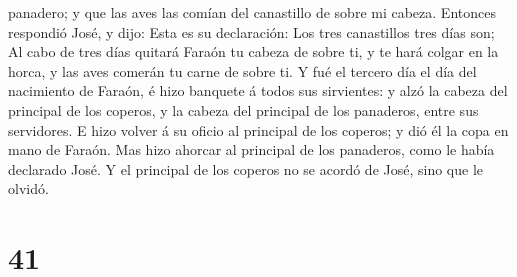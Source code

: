 panadero; y que las aves las comían del canastillo de sobre mi cabeza.
 Entonces respondió José, y dijo: Esta es su declaración:
Los tres canastillos tres días son;  Al cabo de tres días
quitará Faraón tu cabeza de sobre ti, y te hará colgar en la horca, y
las aves comerán tu carne de sobre ti.  Y fué el tercero
día el día del nacimiento de Faraón, é hizo banquete á todos sus
sirvientes: y alzó la cabeza del principal de los coperos, y la cabeza
del principal de los panaderos, entre sus servidores.  E
hizo volver á su oficio al principal de los coperos; y dió él la copa en
mano de Faraón.  Mas hizo ahorcar al principal de los
panaderos, como le había declarado José.  Y el principal de
los coperos no se acordó de José, sino que le olvidó.

\hypertarget{section-40}{%
\section{41}\label{section-40}}

